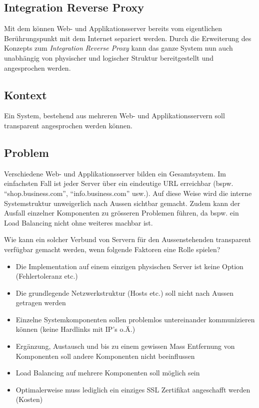\subsection{Integration Reverse Proxy}
\label{sec:integration-reverse-proxy}

Mit dem  können Web- und Applikationsserver bereits vom eigentlichen Berührungspunkt mit dem Internet separiert werden. Durch die Erweiterung des Konzepts zum \emph{Integration Reverse Proxy} kann das ganze System nun auch unabhängig von physischer und logischer Struktur bereitgestellt und angesprochen werden.

\subsection*{Kontext}
Ein System, bestehend aus mehreren Web- und Applikationsservern soll transparent angesprochen werden können.

\subsection*{Problem}
Verschiedene Web- und Applikationsserver bilden ein Gesamtsystem. Im einfachsten Fall ist jeder Server über ein eindeutige URL erreichbar (bspw. ``shop.business.com'', ``info.business.com'' usw.). Auf diese Weise wird die interne Systemstruktur unweigerlich nach Aussen sichtbar gemacht. Zudem kann der Ausfall einzelner Komponenten zu grösseren Problemen führen, da bspw. ein Load Balancing nicht ohne weiteres machbar ist.

Wie kann ein solcher Verbund von Servern für den Aussenstehenden transparent verfügbar gemacht werden, wenn folgende Faktoren eine Rolle spielen?

\begin{itemize}
	\item Die Implementation auf einem einzigen physischen Server ist keine Option (Fehlertoleranz etc.)
	\item Die grundlegende Netzwerkstruktur (Hosts etc.) soll nicht nach Aussen getragen werden
	\item Einzelne Systemkomponenten sollen problemlos untereinander kommunizieren können (keine Hardlinks mit IP's o.Ä.)
	\item Ergänzung, Austausch und bis zu einem gewissen Mass Entfernung von Komponenten soll andere Komponenten nicht beeinflussen
	\item Load Balancing auf mehrere Komponenten soll möglich sein
	\item Optimalerweise muss lediglich ein einziges SSL Zertifikat angeschafft werden (Kosten)
\end{itemize}

